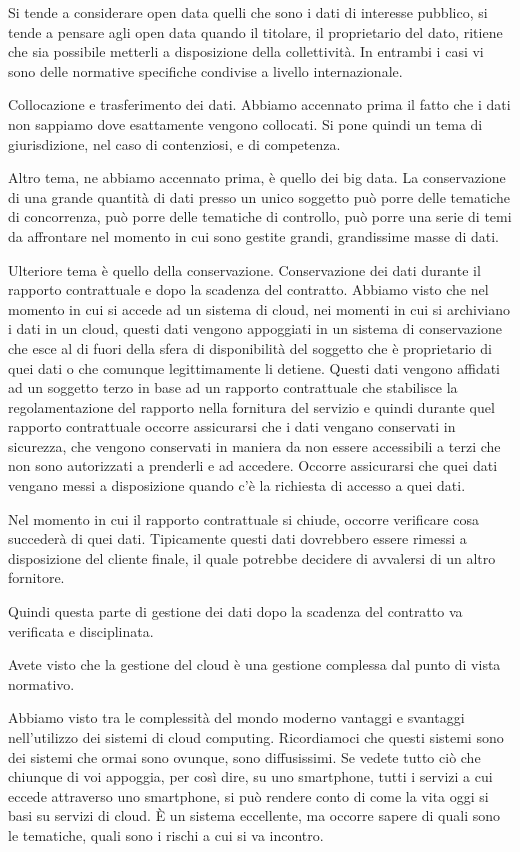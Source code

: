 Si tende a considerare open data quelli che sono i dati di interesse pubblico, si tende a pensare agli open data quando il titolare, il proprietario del dato, ritiene che sia possibile metterli a disposizione della collettività. In entrambi i casi vi sono delle normative specifiche condivise a livello internazionale. 

Collocazione e trasferimento dei dati. Abbiamo accennato prima il fatto che i dati non sappiamo dove esattamente vengono collocati. Si pone quindi un tema di giurisdizione, nel caso di contenziosi, e di competenza. 

Altro tema, ne abbiamo accennato prima, è quello dei big data. La conservazione di una grande quantità di dati presso un unico soggetto può porre delle tematiche di concorrenza, può porre delle tematiche di controllo, può porre una serie di temi da affrontare nel momento in cui sono gestite grandi, grandissime masse di dati. 

Ulteriore tema è quello della conservazione. Conservazione dei dati durante il rapporto contrattuale e dopo la scadenza del contratto. Abbiamo visto che nel momento in cui si accede ad un sistema di cloud, nei momenti in cui si archiviano i dati in un cloud, questi dati vengono appoggiati in un sistema di conservazione che esce al di fuori della sfera di disponibilità del soggetto che è proprietario di quei dati o che comunque legittimamente li detiene. Questi dati vengono affidati ad un soggetto terzo in base ad un rapporto contrattuale che stabilisce la regolamentazione del rapporto nella fornitura del servizio e quindi durante quel rapporto contrattuale occorre assicurarsi che i dati vengano conservati in sicurezza, che vengono conservati in maniera da non essere accessibili a terzi che non sono autorizzati a prenderli e ad accedere. Occorre assicurarsi che quei dati vengano messi a disposizione quando c'è la richiesta di accesso a quei dati. 

Nel momento in cui il rapporto contrattuale si chiude, occorre verificare cosa succederà di quei dati. Tipicamente questi dati dovrebbero essere rimessi a disposizione del cliente finale, il quale potrebbe decidere di avvalersi di un altro fornitore. 

Quindi questa parte di gestione dei dati dopo la scadenza del contratto va verificata e disciplinata. 

Avete visto che la gestione del cloud è una gestione complessa dal punto di vista normativo.

Abbiamo visto tra le complessità del mondo moderno vantaggi e svantaggi nell'utilizzo dei sistemi di cloud computing. Ricordiamoci che questi sistemi sono dei sistemi che ormai sono ovunque, sono diffusissimi. Se vedete tutto ciò che chiunque di voi appoggia, per così dire, su uno smartphone, tutti i servizi a cui eccede attraverso uno smartphone, si può rendere conto di come la vita oggi si basi su servizi di cloud. È un sistema eccellente, ma occorre sapere di quali sono le tematiche, quali sono i rischi a cui si va incontro.

